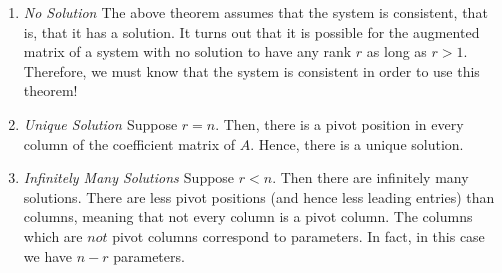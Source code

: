 \begin{enumerate}
\item {\em No Solution \em}
The above theorem assumes that the system is consistent, that is, that it has a solution. It turns out that it is possible for the 
augmented matrix of a system with no solution to have any rank $r$ as long as $r>1$. Therefore, we must know 
that the system is consistent in order to use this theorem!   

\item {\em Unique Solution \em}
Suppose $r=n$. Then, there is a pivot position in every column of the coefficient matrix of $A$. Hence, there is a unique solution.

\item {\em Infinitely Many Solutions \em}
Suppose $r<n$. Then there are infinitely many solutions. There are less pivot positions (and hence less leading entries) than columns, meaning that not every column is a pivot column. The columns which are $not$ pivot columns correspond to parameters. In fact,
in this case we have $n-r$ parameters.
\end{enumerate}